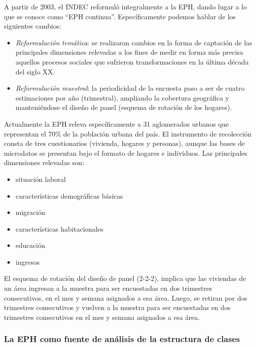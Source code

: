\documentclass[
]{article}
\providecommand{\tightlist}{%
  \setlength{\itemsep}{0pt}\setlength{\parskip}{0pt}}
\begin{document}
A partir de 2003, el INDEC reformuló integralmente a la EPH, dando lugar a lo que se conoce como ``EPH continua''. Específicamente podemos hablar de los siguientes cambios:

\begin{itemize}
\item
  \emph{Reformulación temática}: se realizaron cambios en la forma de captación de las principales dimensiones relevadas a los fines de medir en forma más precisa aquellos procesos sociales que sufrieron transformaciones en la última década del siglo XX.
\item
  \emph{Reformulación muestral}: la periodicidad de la encuesta paso a ser de cuatro estimaciones por año (trimestral), ampliando la cobertura geográfica y manteniéndose el diseño de panel (esquema de rotación de los hogares).
\end{itemize}

Actualmente la EPH releva específicamente a 31 aglomerados urbanos que representan el 70\% de la población urbana del país. El instrumento de recolección consta de tres cuestionarios (vivienda, hogares y personas), aunque las bases de microdatos se presentan bajo el formato de hogares e individuos. Las principales dimensiones relevadas son:

\begin{itemize}
\tightlist
\item
  situación laboral
\item
  características demográficas básicas
\item
  migración
\item
  características habitacionales
\item
  educación
\item
  ingresos
\end{itemize}

El esquema de rotación del diseño de panel (2-2-2), implica que las viviendas de un área ingresan a la muestra para ser encuestadas en dos trimestres consecutivos, en el mes y semana asignados a esa área. Luego, se retiran por dos trimestres consecutivos y vuelven a la muestra para ser encuestadas en dos trimestres consecutivos en el mes y semana asignados a esa área.

\hypertarget{la-eph-como-fuente-de-anuxe1lisis-de-la-estructura-de-clases}{%
\subsubsection{La EPH como fuente de análisis de la estructura de clases}\label{la-eph-como-fuente-de-anuxe1lisis-de-la-estructura-de-clases}}
\end{document}
